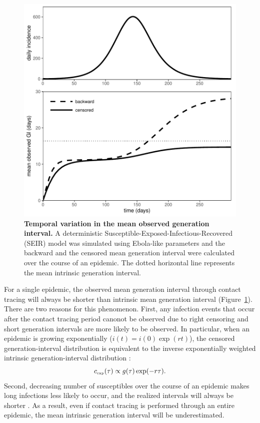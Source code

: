 \documentclass[12pt]{article}
\newcommand{\tsub}[2]{#1_{{\textrm{\tiny #2}}}}
\begin{document}
\begin{figure}[!ht]
\includegraphics[width=\textwidth]{../fig/temporal_effect.pdf}
\caption{\textbf{Temporal variation in the mean observed generation interval.}
A deterministic Susceptible-Exposed-Infectious-Recovered (SEIR) model was simulated using Ebola-like parameters and the backward and the censored mean generation interval were calculated over the course of an epidemic.
The dotted horizontal line represents the mean intrinsic generation interval.
}
\label{fig:censor}
\end{figure}

For a single epidemic, the observed mean generation interval through contact tracing will always be shorter than intrinsic mean generation interval (Figure~\ref{fig:censor}).
There are two reasons for this phenomenon.
First, any infection events that occur after the contact tracing period canonot be observed due to right censoring and short generation intervals are more likely to be observed.
In particular, when an epidemic is growing exponentially ($i(t) = i(0) \exp(rt)$), 
the censored generation-interval distribution is equivalent to the inverse exponentially weighted intrinsic generation-interval distribution \citep{britton2019estimation}:
\begin{equation}
\tsub{c}{exp}(\tau) \propto g(\tau) \exp(-r\tau).
\label{eq:exp}
\end{equation}
Second, decreasing number of susceptibles over the course of an epidemic makes long infections less likely to occur, and the realized intervals will always be shorter \citep{champredon2015intrinsic}.
As a result, even if contact tracing is performed through an entire epidemic, the mean intrinsic generation interval will be underestimated.
\end{document}
